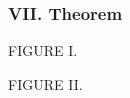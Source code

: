 \documentclass[12pt,preview]{standalone}
\begin{document}
\subsubsection{VII. Theorem}

\begin{minipage}[t]{0.43\textwidth}
    \vspace{20pt}
    \begin{center}
        FIGURE I.
    \end{center}
    \vspace{1ex}
    
    \begin{center}
        FIGURE II.
    \end{center}
    \vspace{1ex}
    
\end{minipage}%
\hfill
\end{document}
